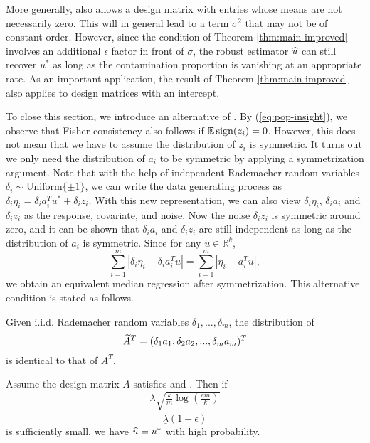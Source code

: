 More generally, \conditionA{} also allows a design matrix with entries whose means are not necessarily zero. This will in general lead to a term $\sigma^2$ that may not be of constant order. However, since the condition of Theorem \ref{thm:main-improved} involves an additional $\epsilon$ factor in front of $\sigma$, the robust estimator $\widehat{u}$ can still recover $u^*$ as long as the contamination proportion is vanishing at an appropriate rate. As an important application, the result of Theorem \ref{thm:main-improved} also applies to design matrices with an intercept.

To close this section, we introduce an alternative of \conditionA. By (\ref{eq:pop-insight}), we observe that Fisher consistency also follows if $\mathbb{E}\mathop{\rm sign}(z_i)=0$. However, this does not mean that we have to assume the distribution of $z_i$ is symmetric. It turns out we only need the distribution of $a_i$ to be symmetric by applying a symmetrization argument.
Note that with the help of independent Rademacher random variables $\delta_i\sim\text{Uniform}\{\pm 1\}$, we can write the data generating process as $\delta_i\eta_i=\delta_ia_i^Tu^*+\delta_iz_i$. With this new representation, we can also view $\delta_i\eta_i$, $\delta_ia_i$ and $\delta_iz_i$ as the response, covariate, and noise. Now the noise $\delta_iz_i$ is symmetric around zero, and it can be shown that $\delta_ia_i$ and $\delta_iz_i$ are still independent as long as the distribution of $a_i$ is symmetric. Since for any $u\in\mathbb{R}^k$,
$$\sum_{i=1}^m|\delta_i\eta_i- \delta_ia_i^Tu|=\sum_{i=1}^m|\eta_i-a_i^Tu|,$$
we obtain an equivalent median regression after symmetrization.
This alternative condition is stated as follows.


\begin{con1}
Given i.i.d. Rademacher random variables $\delta_1,...,\delta_m$, the distribution of
$$\widetilde{A}^T=(\delta_1a_1,\delta_2a_2,...,\delta_ma_m)^T$$
is identical to that of $A^T$.
\end{con1}

\begin{thm}\label{thm:robust-reg}
Assume the design matrix $A$ satisfies \conditionAp{} and \conditionB. Then if $$\frac{\overline{\lambda}\sqrt{\frac{k}{m}\log\left(\frac{em}{k}\right)}}{\underline{\lambda}(1-\epsilon)}$$
is sufficiently small, we have $\widehat{u}=u^*$ with high probability.
\end{thm}
